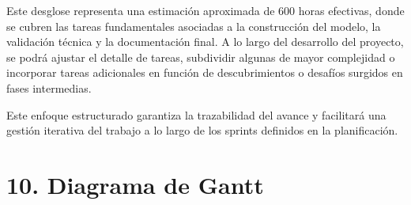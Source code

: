 \documentclass[
11pt, %
]{charter}
\begin{document}
Este desglose representa una estimación aproximada de 600 horas efectivas, donde se cubren las tareas fundamentales asociadas a la construcción del modelo, la validación técnica y la documentación final. A lo largo del desarrollo del proyecto, se podrá ajustar el detalle de tareas, subdividir algunas de mayor complejidad o incorporar tareas adicionales en función de descubrimientos o desafíos surgidos en fases intermedias.

Este enfoque estructurado garantiza la trazabilidad del avance y facilitará una gestión iterativa del trabajo a lo largo de los sprints definidos en la planificación.

\section{10. Diagrama de Gantt}
\label{sec:gantt}
\end{document}
